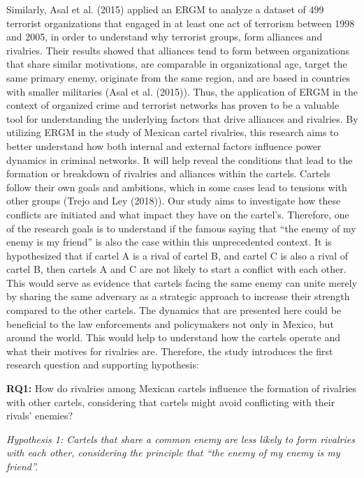 \documentclass[
]{article}
\begin{document}
Similarly, Asal et al. (2015) applied an ERGM to analyze a dataset of
499 terrorist organizations that engaged in at least one act of
terrorism between 1998 and 2005, in order to understand why terrorist
groups, form alliances and rivalries. Their results showed that
alliances tend to form between organizations that share similar
motivations, are comparable in organizational age, target the same
primary enemy, originate from the same region, and are based in
countries with smaller militaries (Asal et al. (2015)). Thus, the
application of ERGM in the context of organized crime and terrorist
networks has proven to be a valuable tool for understanding the
underlying factors that drive alliances and rivalries. By utilizing ERGM
in the study of Mexican cartel rivalries, this research aims to better
understand how both internal and external factors influence power
dynamics in criminal networks. It will help reveal the conditions that
lead to the formation or breakdown of rivalries and alliances within the
cartels. Cartels follow their own goals and ambitions, which in some
cases lead to tensions with other groups (Trejo and Ley (2018)). Our
study aims to investigate how these conflicts are initiated and what
impact they have on the cartel's. Therefore, one of the research goals
is to understand if the famous saying that ``the enemy of my enemy is my
friend'' is also the case within this unprecedented context. It is
hypothesized that if cartel A is a rival of cartel B, and cartel C is
also a rival of cartel B, then cartels A and C are not likely to start a
conflict with each other. This would serve as evidence that cartels
facing the same enemy can unite merely by sharing the same adversary as
a strategic approach to increase their strength compared to the other
cartels. The dynamics that are presented here could be beneficial to the
law enforcements and policymakers not only in Mexico, but around the
world. This would help to understand how the cartels operate and what
their motives for rivalries are. Therefore, the study introduces the
first research question and supporting hypothesis:

\textbf{RQ1:} How do rivalries among Mexican cartels influence the
formation of rivalries with other cartels, considering that cartels
might avoid conflicting with their rivals' enemies?

\emph{Hypothesis 1: Cartels that share a common enemy are less likely to
form rivalries with each other, considering the principle that ``the
enemy of my enemy is my friend''.}
\end{document}
